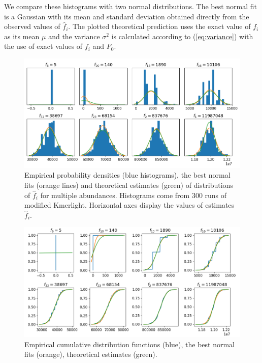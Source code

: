 We compare these histograms with two normal distributions. The best normal fit is a Gaussian
with its mean and standard deviation obtained directly from the observed values of $\hat f_i$.
The plotted theoretical prediction uses the exact value of $f_i$ as its mean $\mu$ and
the variance $\sigma^2$ is calculated according to (\ref{eq:variance}) with the use of
exact values of $f_i$ and $F_0$. 


\begin{figure}[h]
\centerline{\includegraphics[width=1\textwidth, trim={0cm, 0.1cm, 0cm, 0cm}, clip]{images/pdf2.png}}
\caption[Density functions of $\hat f_i$]{Empirical probability densities (blue histograms), the best
normal fits (orange lines) and theoretical estimates (green) of distributions of $\hat f_i$
for multiple abundances. Histograms come from 300 runs of modified Kmerlight.
Horizontal axes display the values of estimates $\hat f_i$.}
\label{img:estimated-pdf}
\end{figure}

\begin{figure}[h!]
\centerline{\includegraphics[width=1\textwidth, trim={0cm, 0.1cm, 0cm, 0cm}, clip]{images/cdf2.png}}
\caption[Distribution functions of $\hat f_i$]{Empirical cumulative distribution functions (blue), 
the best normal fits (orange), theoretical estimates (green).}
\label{img:estimated-cdf}
\end{figure}

